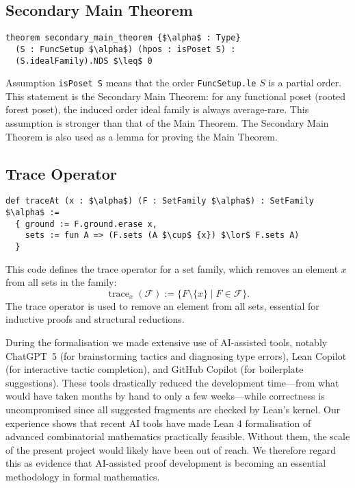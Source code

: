 \documentclass[a4paper,11pt]{article}
\begin{document}
\subsection*{Secondary Main Theorem}
\begin{lstlisting}
theorem secondary_main_theorem {$\alpha$ : Type}
  (S : FuncSetup $\alpha$) (hpos : isPoset S) :
  (S.idealFamily).NDS $\leq$ 0
\end{lstlisting}
Assumption \texttt{isPoset S} means that the order \texttt{FuncSetup.le} $S$ is a partial order.
This statement is the Secondary Main Theorem: for any functional poset (rooted forest poset), the induced order ideal family is always average-rare.
This assumption is stronger than that of the Main Theorem. The Secondary Main Theorem is also used as a lemma for proving the Main Theorem.

\subsection*{Trace Operator}
\begin{lstlisting}
def traceAt (x : $\alpha$) (F : SetFamily $\alpha$) : SetFamily $\alpha$ :=
  { ground := F.ground.erase x,
    sets := fun A => (F.sets (A $\cup$ {x}) $\lor$ F.sets A)
  }

\end{lstlisting}
This code defines the trace operator for a set family, which removes an element \(x\) from all sets in the family:
\[
\operatorname{trace}_x(\mathcal{F}) := \{ F \setminus \{x\} \mid F \in \mathcal{F} \}.
\]
The trace operator is used to remove an element from all sets, essential for inductive proofs and structural reductions.

During the formalisation we made extensive use of AI-assisted tools, notably ChatGPT~5 (for brainstorming tactics and diagnosing type errors), Lean Copilot (for interactive tactic completion), and GitHub Copilot (for boilerplate suggestions). These tools drastically reduced the development time—from what would have taken months by hand to only a few weeks—while correctness is uncompromised since all suggested fragments are checked by Lean’s kernel.
Our experience shows that recent AI tools have made Lean 4 formalisation of advanced combinatorial mathematics practically feasible. Without them, the scale of the present project would likely have been out of reach. We therefore regard this as evidence that AI-assisted proof development is becoming an essential methodology in formal mathematics.
\end{document}
